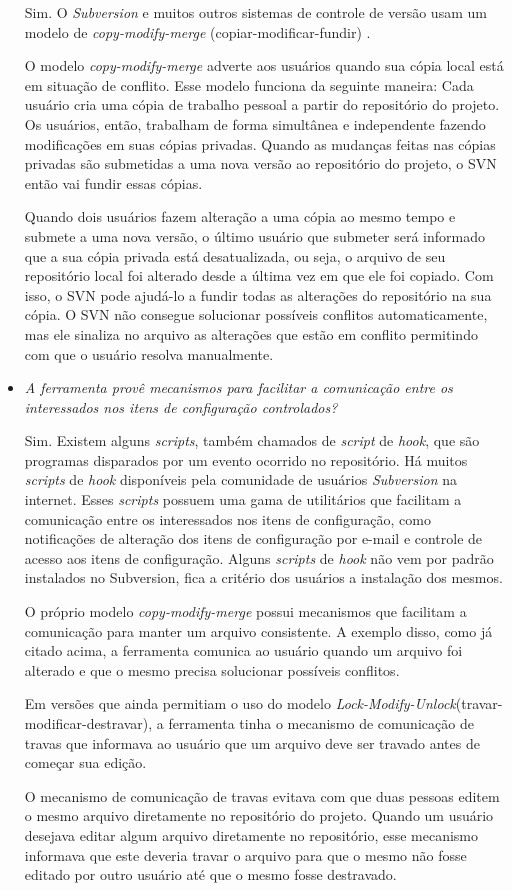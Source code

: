 \begin{itemize}
  Sim. O \textit{Subversion} e muitos outros sistemas de controle de versão usam um modelo de \textit{copy-modify-merge} (copiar-modificar-fundir) \cite{svn-book}. 
  
  O modelo \textit{copy-modify-merge} adverte aos usuários quando sua cópia local está em situação de conflito.
  Esse modelo funciona da seguinte maneira: 
  Cada usuário cria uma cópia de trabalho pessoal a partir do repositório do projeto. Os usuários, então, 
  trabalham de forma simultânea e independente fazendo modificações em suas cópias privadas. Quando as mudanças 
  feitas nas cópias privadas são submetidas a uma nova versão ao repositório do projeto, o SVN então vai fundir essas cópias.
  
  Quando dois usuários fazem alteração a uma cópia ao mesmo tempo e submete a uma nova versão, o último usuário que submeter será informado
  que a sua cópia privada está desatualizada, ou seja, o arquivo de seu repositório local foi alterado desde a 
  última vez em que ele foi copiado. Com isso, o SVN pode ajudá-lo a fundir todas as alterações do repositório na sua cópia. 
  O SVN não consegue solucionar possíveis conflitos automaticamente, mas ele sinaliza no arquivo as alterações que estão em conflito
   permitindo com que o usuário resolva manualmente.
   
     \item \textit{A ferramenta provê mecanismos para facilitar a comunicação entre os interessados nos itens de
  configuração controlados?}
  
  Sim. Existem alguns \textit{scripts}, também chamados de \textit{script} de \textit{hook}, que são programas disparados por um evento ocorrido no repositório\cite{svn-book}.
  Há muitos \textit{scripts} de \textit{hook} disponíveis pela comunidade de usuários \textit{Subversion} na internet. Esses \textit{scripts} possuem uma gama de utilitários que facilitam 
  a comunicação entre os interessados nos itens de configuração, como notificações de alteração dos itens de configuração por e-mail 
  e controle de acesso aos itens de configuração. Alguns \textit{scripts} de \textit{hook} não vem por padrão instalados no Subversion, fica a critério dos usuários a instalação dos mesmos.
  
  O próprio modelo \textit{copy-modify-merge} possui mecanismos que facilitam a comunicação para manter um arquivo consistente.
  A exemplo disso, como já citado acima, a ferramenta comunica ao usuário quando um arquivo foi alterado e que o mesmo precisa solucionar
  possíveis conflitos.
  
  Em versões que ainda permitiam o uso do modelo \textit{Lock-Modify-Unlock}(travar-modificar-destravar), a ferramenta tinha o mecanismo de comunicação de travas que informava ao usuário que um arquivo deve ser travado antes 
  de começar sua edição. 
  
  O mecanismo de comunicação de travas evitava com que duas pessoas editem o mesmo arquivo diretamente no repositório do projeto. Quando
  um usuário desejava editar algum arquivo diretamente no repositório, esse mecanismo informava que este deveria travar o arquivo para que o mesmo 
  não fosse editado por outro usuário até que o mesmo fosse destravado.
\end{itemize}
